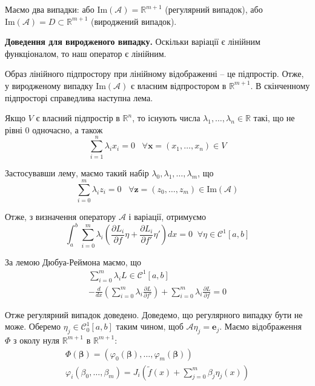 \documentclass[14pt]{extarticle}
\newcommand{\<}{\langle}
\renewcommand{\>}{\rangle}
\theoremstyle{mystyle}{\newtheorem{definition}{Definition}[section]}
\theoremstyle{mystyle}{\newtheorem{proposition}[definition]{Proposition}}
\theoremstyle{mystyle}{\newtheorem{theorem}[definition]{Theorem}}
\theoremstyle{mystyle}{\newtheorem{lemma}[definition]{Lemma}}
\theoremstyle{mystyle}{\newtheorem{corollary}[definition]{Corollary}}
\theoremstyle{mystyle}{\newtheorem*{remark}{Remark}}
\theoremstyle{mystyle}{\newtheorem*{remarks}{Remarks}}
\theoremstyle{mystyle}{\newtheorem*{example}{Example}}
\theoremstyle{mystyle}{\newtheorem*{examples}{Examples}}
\theoremstyle{definition}{\newtheorem*{exercise}{Exercise}}
\theoremstyle{cstyle}{\newtheorem*{cthm}{}}
\theoremstyle{warn}
\begin{document}
Маємо два випадки: або $\text{Im}(\mathcal{A}) = \mathbb{R}^{m+1}$ (регулярний випадок), або $\text{Im}(\mathcal{A}) = D \subset \mathbb{R}^{m+1}$ (вироджений випадок).

\textbf{Доведення для виродженого випадку.} Оскільки варіації є лінійним функціоналом, то наш оператор є лінійним. 

Образ лінійного підпростору при лінійному відображенні -- це підпростір. Отже, у виродженому випадку 
$\text{Im}(\mathcal{A})$ є власним відпростором в $\mathbb{R}^{m+1}$. В скінченному підпросторі справедлива наступна лема.

\begin{lemma}
    Якщо $V$ є власний підпростір в $\mathbb{R}^n$, то існують числа $\lambda_1,\dots,\lambda_n \in \mathbb{R}$ такі, що не рівні 0 одночасно, а також
    \begin{equation}
        \sum_{i=1}^n \lambda_ix_i = 0 \;\;\; \forall \mathbf{x}=(x_1,\dots,x_n) \in V
    \end{equation}
\end{lemma}

Застосувавши лему, маємо такий набір $\lambda_0,\lambda_1,\dots,\lambda_m$, що
\begin{equation}
    \sum_{i=0}^m\lambda_i z_i = 0 \; \; \; \forall \mathbf{z} = (z_0,\dots,z_m) \in \text{Im}(\mathcal{A})
\end{equation}

Отже, з визначення оператору $\mathcal{A}$ і варіації, отримуємо
\begin{equation}
    \int_a^b \sum_{i=0}^m \lambda_i\left(\frac{\partial L_i}{\partial f}\eta + \frac{\partial L_i}{\partial f'}\eta'\right)dx = 0 \;\; \forall \eta \in \mathcal{C}^1[a,b]
\end{equation}

За лемою Дюбуа-Реймона маємо, що 
\begin{gather}
    \sum_{i=0}^m \lambda_i L \in \mathcal{C}^1[a,b] \\
    -\frac{d}{dx}\left(\sum_{i=0}^m\lambda_i\frac{\partial L}{\partial f'}\right) + \sum_{i=0}^m \lambda_i\frac{\partial L}{\partial f} = 0
\end{gather}

Отже регулярний випадок доведено. Доведемо, що регулярного випадку бути не може. Оберемо $\eta_j \in \mathcal{C}_0^1[a,b]$ таким чином, щоб
$\mathcal{A}\eta_j = \mathbf{e}_j$. Маємо відображення $\Phi$ з околу нуля $\mathbb{R}^{m+1}$ в $\mathbb{R}^{m+1}$:
\begin{gather}
    \Phi(\boldsymbol{\beta}) = (\varphi_0(\boldsymbol{\beta}),\dots,\varphi_m(\boldsymbol{\beta})) \\
    \varphi_i(\beta_0,\dots,\beta_m) = J_i\left(\widetilde{f}(x)+\sum_{j=0}^m\beta_j\eta_j(x)\right)
\end{gather}
\end{document}
